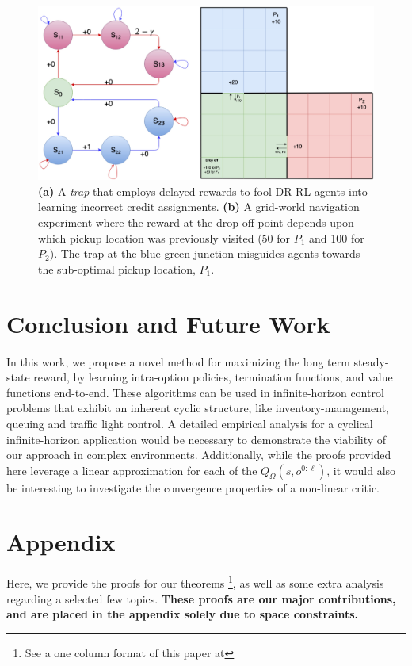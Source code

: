 \documentclass[letterpaper]{article} %
\begin{document}
\begin{figure}[t]
\centering
\includegraphics[width=\columnwidth]{BadCreditAndFRms.jpg} %
\caption{ \textbf{(a)} A \textit{trap} that employs delayed rewards to fool DR-RL agents into learning incorrect credit assignments. \textbf{(b)} A grid-world navigation experiment where the reward at the drop off point depends upon which pickup location was previously visited (50 for $P_1$ and 100 for $P_2$). The trap at the blue-green junction misguides agents towards the sub-optimal pickup location, $P_1$. }
\label{fig3}
\end{figure}

\section{Conclusion and Future Work}
In this work, we propose a novel method for maximizing the long term steady-state reward, by learning intra-option policies, termination functions, and value functions end-to-end. These algorithms can be used in infinite-horizon control problems that exhibit an inherent cyclic structure, like inventory-management, queuing and traffic light control. A detailed empirical analysis for a cyclical infinite-horizon application would be necessary to demonstrate the viability of our approach in complex environments. Additionally, while the proofs provided here leverage a linear approximation for each of the $Q_\Omega(s,o^{0:\ell})$, it would also be interesting to investigate the convergence properties of a non-linear critic. 








\appendix
\section{Appendix}
Here, we provide the proofs for our theorems \footnote{See a one column format of this paper at }, as well as some extra analysis regarding a selected few topics. \textbf{These proofs are our major contributions, and are placed in the appendix solely due to space constraints.}
\end{document}
